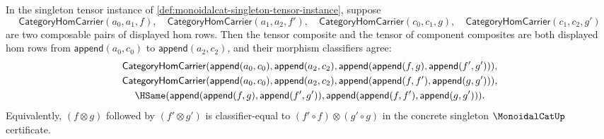 \begin{theorem}
\label{thm:monoidalcat-singleton-tensor-preserves-composition}
In the singleton tensor instance of \autoref{def:monoidalcat-singleton-tensor-instance}, suppose
$$
\mathsf{CategoryHomCarrier}(a_0,a_1,f),\quad
\mathsf{CategoryHomCarrier}(a_1,a_2,f'),\quad
\mathsf{CategoryHomCarrier}(c_0,c_1,g),\quad
\mathsf{CategoryHomCarrier}(c_1,c_2,g')
$$
are two composable pairs of displayed hom rows. Then the tensor composite and the tensor of component composites are both displayed hom rows from $\mathsf{append}(a_0,c_0)$ to $\mathsf{append}(a_2,c_2)$, and their morphism classifiers agree:
$$
\begin{gathered}
\mathsf{CategoryHomCarrier}
  (\mathsf{append}(a_0,c_0),\mathsf{append}(a_2,c_2),
   \mathsf{append}(\mathsf{append}(f,g),\mathsf{append}(f',g'))),\\
\mathsf{CategoryHomCarrier}
  (\mathsf{append}(a_0,c_0),\mathsf{append}(a_2,c_2),
   \mathsf{append}(\mathsf{append}(f,f'),\mathsf{append}(g,g'))),\\
\HSame(\mathsf{append}(\mathsf{append}(f,g),\mathsf{append}(f',g')),
       \mathsf{append}(\mathsf{append}(f,f'),\mathsf{append}(g,g'))).
\end{gathered}
$$
Equivalently, $(f\otimes g)$ followed by $(f'\otimes g')$ is classifier-equal to $(f'\circ f)\otimes(g'\circ g)$ in the concrete singleton $\MonoidalCatUp$ certificate.
\end{theorem}
